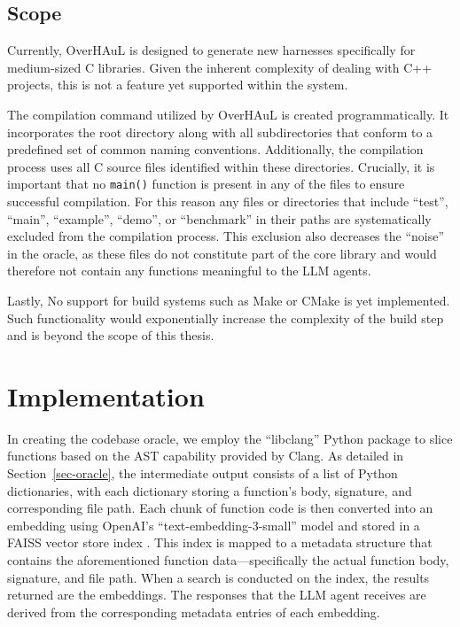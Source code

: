 \documentclass[
  a4paper,
]{scrreprt}
\theoremstyle{definition}
\theoremstyle{remark}
\begin{document}
\section{Scope}\label{sec-scope}

Currently, OverHAuL is designed to generate new harnesses specifically
for medium-sized C libraries. Given the inherent complexity of dealing
with C++ projects, this is not a feature yet supported within the
system.

The compilation command utilized by OverHAuL is created
programmatically. It incorporates the root directory along with all
subdirectories that conform to a predefined set of common naming
conventions. Additionally, the compilation process uses all C source
files identified within these directories. Crucially, it is important
that no \texttt{main()} function is present in any of the files to
ensure successful compilation. For this reason any files or directories
that include ``test'', ``main'', ``example'', ``demo'', or ``benchmark''
in their paths are systematically excluded from the compilation process.
This exclusion also decreases the ``noise'' in the oracle, as these
files do not constitute part of the core library and would therefore not
contain any functions meaningful to the LLM agents.

Lastly, No support for build systems such as Make or CMake
\autocite{cedilnik2000,feldman1979} is yet implemented. Such
functionality would exponentially increase the complexity of the build
step and is beyond the scope of this thesis.


\chapter{Implementation}\label{sec-implementation}

In creating the codebase oracle, we employ the ``libclang'' Python
package \autocite{he2025} to slice functions based on the AST capability
provided by Clang. As detailed in Section~\ref{sec-oracle}, the
intermediate output consists of a list of Python dictionaries, with each
dictionary storing a function's body, signature, and corresponding file
path. Each chunk of function code is then converted into an embedding
using OpenAI's ``text-embedding-3-small'' model
\autocite{openaidocs2025a} and stored in a FAISS vector store index
\autocite{faiss}. This index is mapped to a metadata structure that
contains the aforementioned function data---specifically the actual
function body, signature, and file path. When a search is conducted on
the index, the results returned are the embeddings. The responses that
the LLM agent receives are derived from the corresponding metadata
entries of each embedding.
\end{document}
